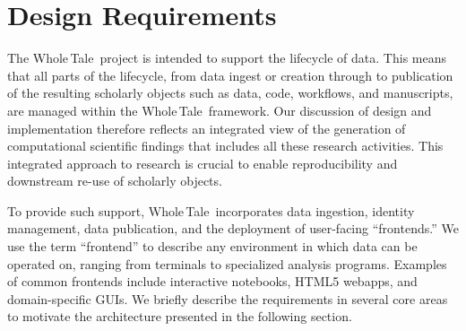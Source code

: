\documentclass[review]{elsarticle}
\newcommand{\wt}{Whole\,Tale}
\begin{document}
\section{Design Requirements}\label{sec:design}

The \wt\ project is intended to support the lifecycle of data. This means that all parts of the lifecycle, from data ingest or creation through to publication of the resulting scholarly objects such as data, code, workflows, and manuscripts, are managed within the \wt\ framework. Our discussion of design and implementation therefore reflects an integrated view of the generation of computational scientific findings that includes all these research activities. This integrated approach to research is crucial to enable reproducibility and downstream re-use of scholarly objects. 


To provide such support, \wt\ incorporates data ingestion, 
identity management, data publication, and the deployment of user-facing ``frontends.'' We use the term ``frontend'' to describe any environment in which data can be operated on, ranging from
terminals to specialized analysis programs. 
Examples of common frontends include interactive notebooks,
HTML5 webapps, and domain-specific GUIs.
We briefly describe the requirements
in several core areas to motivate the architecture presented in the following section.


\end{document}
